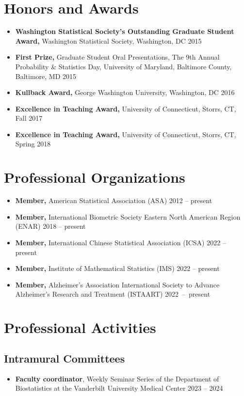 \documentclass[12pt]{article}
\begin{document}
	\section*{Honors and Awards}
	\begin{itemize}
		\item {\bf Washington Statistical Society's Outstanding Graduate Student Award,} Washington Statistical Society, Washington, DC \hfill 2015
		\item {\bf First Prize,} Graduate Student Oral Presentations, The 9th Annual Probability \& Statistics Day,  University of Maryland, Baltimore County, Baltimore, MD \hfill 2015
		\item {\bf Kullback Award,} George Washington University, Washington, DC \hfill 2016
		\item {\bf Excellence in Teaching Award,} University of Connecticut, Storrs, CT, \hfill Fall 2017
		\item {\bf Excellence in Teaching Award,} University of Connecticut, Storrs, CT, \hfill Spring 2018
	\end{itemize}
		
	\section*{Professional Organizations}
	\begin{itemize}
		\item {\bf Member,} American Statistical Association (ASA) \hfill 2012 -- present
		\item {\bf Member,} International Biometric Society Eastern North American Region (ENAR) \hfill 2018 -- present
		\item {\bf Member,} International Chinese Statistical Association (ICSA) \hfill 2022 -- present
		\item {\bf Member,} Institute of Mathematical Statistics (IMS) \hfill 2022 -- present
		\item {\bf Member,} Alzheimer's Association International Society to Advance Alzheimer's Research and Treatment (ISTAART) \hfill \mbox{2022 -- present}
	\end{itemize}

	\section*{Professional Activities}
	
	\subsection*{Intramural Committees}
	\begin{itemize}
		\item {\bf Faculty coordinator}, Weekly Seminar Series of 
		the Department of Biostatistics at the Vanderbilt University 
		Medical Center \hfill 2023 -- 2024
	\end{itemize}
	
\end{document}
